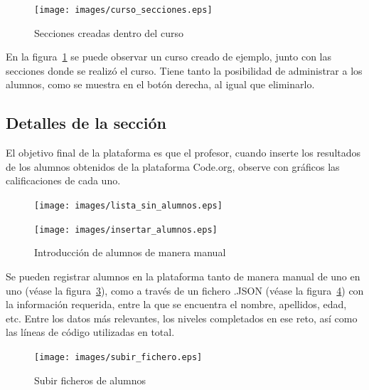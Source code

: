 \begin{figure}[!th]
\begin{center}
\texttt{[image: images/curso\_secciones.eps]}
\caption{Secciones creadas dentro del curso}
\label{fig:17}
\end{center}
\end{figure}

En la figura~\ref{fig:17} se puede observar un curso creado de ejemplo, junto con las secciones donde se realizó el curso. Tiene tanto la posibilidad de administrar a los alumnos, como se muestra en el botón derecha, al igual que eliminarlo.


\newpage
\subsection{Detalles de la sección}
\label{1:sec:6}

El objetivo final de la plataforma es que el profesor, cuando inserte los resultados de los alumnos obtenidos de la plataforma Code.org, observe con gráficos las calificaciones de cada uno.

\begin{figure}[!th]
\begin{center}
\texttt{[image: images/lista\_sin\_alumnos.eps]}
\label{fig:18}
\end{center}
\end{figure}

\begin{figure}[!th]
\begin{center}
\texttt{[image: images/insertar\_alumnos.eps]}
\caption{Introducción de alumnos de manera manual}
\label{fig:19}
\end{center}
\end{figure}

\newpage
Se pueden registrar alumnos en la plataforma tanto de manera manual de uno en uno (véase la figura~\ref{fig:19}), como a través de un fichero .JSON (véase la figura~\ref{fig:20}) con la información requerida, entre la que se encuentra el nombre, apellidos, edad, etc. Entre los datos más relevantes,
los niveles completados en ese reto, así como las líneas de código utilizadas en total.

\begin{figure}[!th]
\begin{center}
\texttt{[image: images/subir\_fichero.eps]}
\caption{Subir ficheros de alumnos}
\label{fig:20}
\end{center}
\end{figure}

